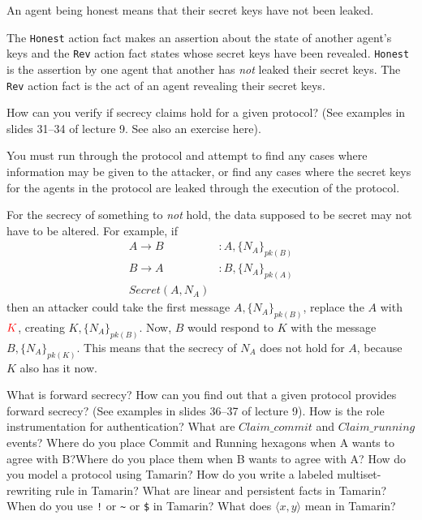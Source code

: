 \begin{questions}
\begin{solution}
    An agent being honest means that their secret keys have not been leaked.

    The \texttt{Honest} action fact makes an assertion about the state of another agent's keys and the \texttt{Rev} action fact states whose secret keys have been revealed.
    \texttt{Honest} is the assertion by one agent that another has \emph{not} leaked their secret keys.
    The \texttt{Rev} action fact is the act of an agent revealing their secret keys.
  \end{solution}

\question{} How can you verify if secrecy claims hold for a given protocol? (See examples in slides 31--34 of lecture 9. See also an exercise here).
  \begin{solution}
    You must run through the protocol and attempt to find any cases where information may be given to the attacker, or find any cases where the secret keys for the agents in the protocol are leaked through the execution of the protocol.

    For the secrecy of something to \emph{not} hold, the data supposed to be secret may not have to be altered.
    For example, if
    \begin{align*}
      A \rightarrow B &: A, {\lbrace N_{A} \rbrace}_{pk(B)} \\
      B \rightarrow A &: B, {\lbrace N_{A} \rbrace}_{pk(A)} \\
      Secret(A, N_{A})
    \end{align*}
    then an attacker could take the first message $A, {\lbrace N_{A} \rbrace}_{pk(B)}$, replace the $A$ with $\textcolor{red}{K}$, creating $K, {\lbrace N_{A} \rbrace}_{pk(B)}$.
    Now, $B$ would respond to $K$ with the message $B, {\lbrace N_{A} \rbrace}_{pk(K)}$.
    This means that the secrecy of $N_{A}$ does not hold for $A$, because $K$ also has it now.
  \end{solution}

\question{} What is forward secrecy?
\question{} How can you find out that a given protocol provides forward secrecy? (See examples in slides 36--37 of lecture 9).
\question{} How is the role instrumentation for authentication? What are $Claim\_commit$ and $Claim\_running$ events? Where do you place Commit and Running hexagons when A wants to agree with B?\@ Where do you place them when B wants to agree with A?\@
\question{} How do you model a protocol using Tamarin? How do you write a labeled multiset-rewriting rule in Tamarin?
\question{} What are linear and persistent facts in Tamarin? When do you use \texttt{!} or \texttt{\textasciitilde{}} or \texttt{\$} in Tamarin?
\question{} What does $\langle x, y \rangle$ mean in Tamarin?
\end{questions}
